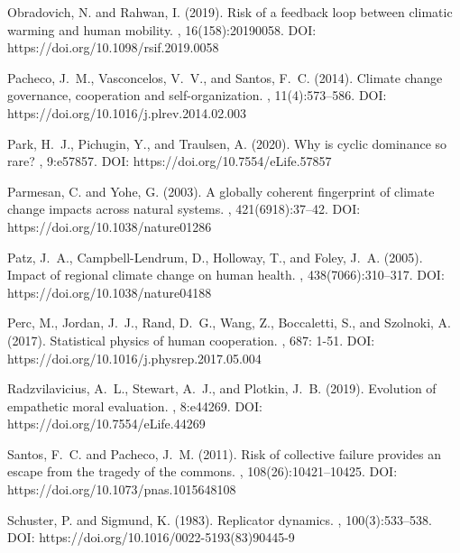 \documentclass[9pt]{elife}
\begin{document}
\begin{thebibliography}{}
Obradovich, N. and Rahwan, I. (2019).
\newblock Risk of a feedback loop between climatic warming and human mobility.
, 16(158):20190058. DOI: https://doi.org/10.1098/rsif.2019.0058

Pacheco, J.~M., Vasconcelos, V.~V., and Santos, F.~C. (2014).
\newblock Climate change governance, cooperation and self-organization.
, 11(4):573--586. DOI: https://doi.org/10.1016/j.plrev.2014.02.003

Park, H.~J., Pichugin, Y., and Traulsen, A. (2020).
\newblock Why is cyclic dominance so rare?
, 9:e57857. DOI: https://doi.org/10.7554/eLife.57857

Parmesan, C. and Yohe, G. (2003).
\newblock A globally coherent fingerprint of climate change impacts across
  natural systems.
, 421(6918):37--42. DOI: https://doi.org/10.1038/nature01286

Patz, J.~A., Campbell-Lendrum, D., Holloway, T., and Foley, J.~A. (2005).
\newblock Impact of regional climate change on human health.
, 438(7066):310--317. DOI: https://doi.org/10.1038/nature04188

Perc, M., Jordan, J.~J., Rand, D.~G., Wang, Z., Boccaletti, S., and Szolnoki, A. (2017).
\newblock Statistical physics of human cooperation.
, 687: 1-51. DOI: https://doi.org/10.1016/j.physrep.2017.05.004

Radzvilavicius, A.~L., Stewart, A.~J., and Plotkin, J.~B. (2019).
\newblock Evolution of empathetic moral evaluation.
, 8:e44269. DOI: https://doi.org/10.7554/eLife.44269

Santos, F.~C. and Pacheco, J.~M. (2011).
\newblock Risk of collective failure provides an escape from the tragedy of the
  commons.
, 108(26):10421--10425. DOI: https://doi.org/10.1073/pnas.1015648108

Schuster, P. and Sigmund, K. (1983).
\newblock Replicator dynamics.
, 100(3):533--538. DOI: https://doi.org/10.1016/0022-5193(83)90445-9


\end{thebibliography}
\end{document}
